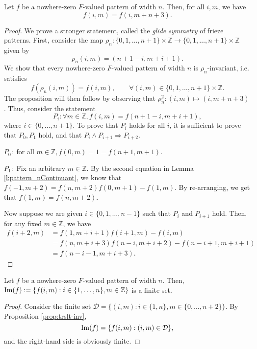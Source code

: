 \begin{proposition}
    \label{prop:trslt-inv}
    Let $f$ be a nowhere-zero $F$-valued pattern of width $n$. Then, for all $i,m$, we have
    \[
        f(i,m) = f(i,m+n+3).
    \]
\end{proposition}
\begin{proof}
    We prove a stronger statement, called the \textit{glide symmetry} of frieze patterns. First, consider 
    the map $\rho_n: \{0,1,\ldots , n+1\} \times \mathbb{Z} \longrightarrow \{0,1,\ldots , n+1\} \times \mathbb{Z}$ given by
    \begin{equation}  
    \label{def:glide}
        \rho_n(i,m) = (n+1-i, m+i+1).
    \end{equation}
    We show that every nowhere-zero $F$-valued pattern of width $n$ is $\rho_n$-invariant, i.e. satisfies 
    \[
        f(\rho_n(i,m)) = f(i,m), \qquad \forall (i,m) \in \{0,1,\ldots , n+1\} \times \mathbb{Z}.
    \]
    The proposition will then follow by observing that $\rho_n^2 : (i,m) \mapsto (i,m+n+3)$. Thus, consider the statement
    \[
        P_i: \forall m \in \mathbb{Z}, f (i,m) = f (n+1-i,m+i+1),
    \]
    where $i \in \{0, \ldots, n+1\}$. To prove that $P_i$ holds for all $i$, it is sufficient to prove that $P_0, P_1$ hold, 
    and that $P_i \wedge P_{i+1} \Rightarrow P_{i+2}$. 

    $P_0:$ for all $m \in \mathbb{Z}, f(0,m) = 1 = f(n+1,m+1)$. 

    $P_1:$ Fix an arbitrary $m \in \mathbb{Z}$. By the second equation in Lemma \ref{l:pattern_nContinuant}, we know that 
    $f (-1,m+2) = f (n,m+2) f (0,m+1) - f (1,m)$. By re-arranging, we get that $f (1,m) = f (n,m+2)$. 

    Now suppose we are given $i \in \{0,1,\ldots , n-1\}$ such that $P_i$ and $P_{i+1}$ hold. Then, for any fixed $m \in \mathbb{Z}$, 
    we have 
    \begin{align*}
        f (i+2,m) &= f (1,m+i+1)f (i+1,m) - f (i,m) \\
                    &= f (n,m+i+3) f (n-i,m+i+2) - f (n- i+1, m + i + 1) \\
                    &= f (n-i-1,m + i + 3).
    \end{align*}
\end{proof}

\begin{corollary}
    \label{cor:ImageFinite}
    Let $f$ be a nowhere-zero $F$-valued pattern of width $n$. Then, ${\rm Im}(f) := \{f (i,m) : i \in \{1,\ldots, n\}, m \in \mathbb{Z}\}$ is
    a finite set. 
\end{corollary}
\begin{proof}
    Consider the finite set $\mathcal{D} = \{(i,m) : i \in \{1,n\}, m \in \{0,\ldots, n+2\}\}$. By Proposition \ref{prop:trslt-inv}, 
    \[
        {\rm Im}(f) = \{f (i,m) : (i,m) \in \mathcal{D}\},
    \]
    and the right-hand side is obviously finite. 
\end{proof}

